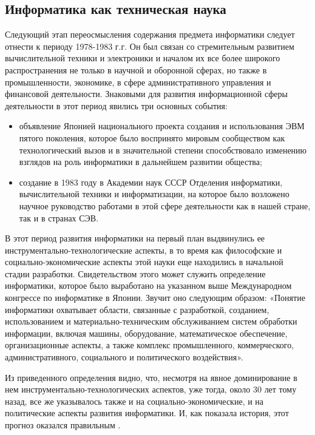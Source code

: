 \subsection{Информатика как техническая наука} \label{subsect1_2_2}

Следующий этап переосмысления содержания предмета информатики следует отнести к периоду 1978-1983 г.г. Он был связан со стремительным развитием вычислительной техники и электроники и началом их все более широкого распространения не только в научной и  оборонной сферах, но также в промышленности, экономике, в сфере административного управления и финансовой  деятельности. Знаковыми для развития информационной сферы деятельности в этот период явились три основных события: 
\begin{itemize}
 конгресс по информатике в Японии, который состоялся в 1978 году и дал новое, более широкое определение содержания термина «Информатика»;
\item объявление Японией национального проекта создания и использования ЭВМ пятого поколения, которое было воспринято мировым сообществом как технологический вызов и в значительной степени способствовало изменению взглядов на роль информатики в дальнейшем развитии общества;
\item создание в 1983 году в Академии наук СССР Отделения информатики, вычислительной техники и информатизации, на которое было возложено научное руководство работами в этой сфере деятельности как в нашей стране, так и в странах СЭВ.
\end{itemize}
         В этот период развития информатики на первый план выдвинулись ее инструментально-технологические аспекты, в то время как философские и социально-экономические аспекты этой науки еще находились в начальной стадии разработки. Свидетельством этого может служить определение информатики, которое было выработано на указанном выше Международном конгрессе по информатике в Японии. Звучит оно следующим образом: «Понятие информатики охватывает области, связанные с разработкой, созданием, использованием и материально-техническим обслуживанием систем обработки информации, включая машины, оборудование, математическое обеспечение, организационные аспекты, а также комплекс промышленного, коммерческого, административного, социального и политического воздействия».

Из приведенного определения видно, что, несмотря на явное доминирование в нем инструментально-технологических аспектов, уже тогда, около 30 лет тому назад, все же указывалось также и на социально-экономические, и на политические аспекты развития информатики. И, как показала история, этот прогноз оказался правильным \cite{bib201}.



\clearpage